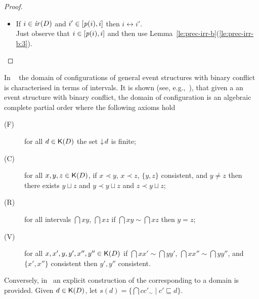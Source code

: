 \begin{proof}
\begin{itemize}
    
  \item If $i \in \mathop{\mathit{ir}({D})}$ and $i' \in [{\mathit{p}({i})},{i}]$ then
    $i \leftrightarrow i'$.\\
    Just observe that $i \in [{\mathit{p}({i})},{i}]$ and then use
    Lemma~\ref{le:prec-irr-b}(\ref{le:prec-irr-b:3}).
  \end{itemize}
  
\end{proof}


In ~\cite{Winskel:phd,Dro:ESD} the domain of
configurations of general event structures with binary conflict is characterised in terms of intervals. It is shown (see, e.g.,~\cite[Theorem 3.3.3]{Winskel:phd}), that given a an event structure with binary conflict, the domain of configuration is an 
algebraic complete partial order where the
following axioms hold

\begin{description}
\item[(F)] for all $d \in \mathop{\mathsf{K}({D})}$ the set $\mathop{\downarrow\!{d}}$ is finite;

\item[(C)] for all $x, y, z \in \mathop{\mathsf{K}({D})}$, if $x \prec y$,
  $x \prec z$, $\{y, z\}$ consistent, and $y \neq z$ then there exists
  $y \sqcup z$ and $y \prec y \sqcup z$ and $z \prec y \sqcup z$;

\item[(R)] for all intervals $\dint{x}{y}$, $\dint{x}{z}$ if
  $\dint{x}{y} \sim \dint{x}{z}$ then $y=z$;


\item[(V)] for all $x,x',y,y',x'',y'' \in \mathop{\mathsf{K}({D})}$ if
  $\dint{x}{x'} \sim \dint{y}{y'}$, $\dint{x}{x''} \sim \dint{y}{y''}$, and $\{x',x''\}$
  consistent then $y',y''$ consistent.
\end{description}


Conversely, in~\cite{Dro:ESD} an explicit construction of the {\esabbr} corresponding to
a domain is provided. Given
$d \in \mathop{\mathsf{K}({D})}$, let
$s(d) = \{ \dint{c}{c'}_{\sim} \mid c' \sqsubseteq d \}$.

